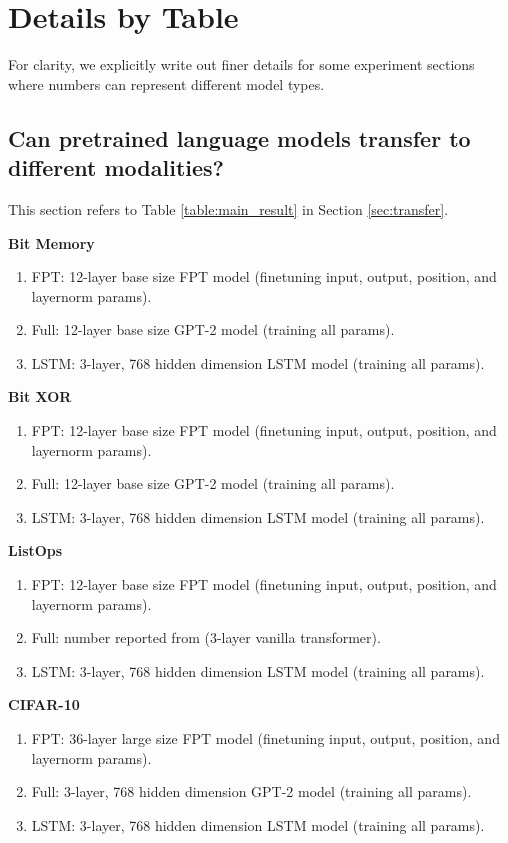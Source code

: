 \section{Details by Table}

For clarity, we explicitly write out finer details for some experiment sections where numbers can represent different model types.

\subsection{Can pretrained language models transfer to different modalities?}

This section refers to Table \ref{table:main_result} in Section \ref{sec:transfer}.

\textbf{Bit Memory}
\begin{enumerate}
    \item FPT: 12-layer base size FPT model (finetuning input, output, position, and layernorm params).
    \item Full: 12-layer base size GPT-2 model (training all params).
    \item LSTM: 3-layer, 768 hidden dimension LSTM model (training all params).
\end{enumerate}

\textbf{Bit XOR}
\begin{enumerate}
    \item FPT: 12-layer base size FPT model (finetuning input, output, position, and layernorm params).
    \item Full: 12-layer base size GPT-2 model (training all params).
    \item LSTM: 3-layer, 768 hidden dimension LSTM model (training all params).
\end{enumerate}

\textbf{ListOps}
\begin{enumerate}
    \item FPT: 12-layer base size FPT model (finetuning input, output, position, and layernorm params).
    \item Full: number reported from \cite{tay2020lra} (3-layer vanilla transformer).
    \item LSTM: 3-layer, 768 hidden dimension LSTM model (training all params).
\end{enumerate}

\textbf{CIFAR-10}
\begin{enumerate}
    \item FPT: 36-layer large size FPT model (finetuning input, output, position, and layernorm params).
    \item Full: 3-layer, 768 hidden dimension GPT-2 model (training all params).
    \item LSTM: 3-layer, 768 hidden dimension LSTM model (training all params).
\end{enumerate}

